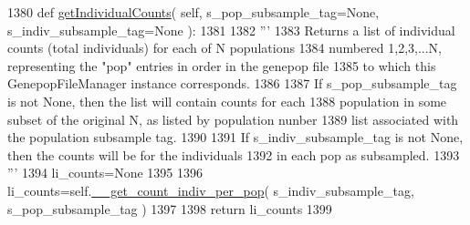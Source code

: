 \begin{DoxyCode}
1380     \textcolor{keyword}{def }\hyperlink{classnegui_1_1genepopfilemanager_1_1GenepopFileManager_aca743749002b9828cd66730e42db4387}{getIndividualCounts}( self, s\_pop\_subsample\_tag=None, s\_indiv\_subsample\_tag=None 
      ):
1381 
1382         \textcolor{stringliteral}{'''}
1383 \textcolor{stringliteral}{        Returns a list of individual counts (total individuals) for each of N populations}
1384 \textcolor{stringliteral}{        numbered 1,2,3,...N, representing the "pop" entries in order in the genepop file}
1385 \textcolor{stringliteral}{        to which this GenepopFileManager instance corresponds.}
1386 \textcolor{stringliteral}{}
1387 \textcolor{stringliteral}{        If s\_pop\_subsample\_tag is not None, then the list will contain counts for each}
1388 \textcolor{stringliteral}{        population in some subset of the original N, as listed by population nunber }
1389 \textcolor{stringliteral}{        list associated with the population subsample tag.}
1390 \textcolor{stringliteral}{}
1391 \textcolor{stringliteral}{        If s\_indiv\_subsample\_tag is not None, then the counts will be for the individuals}
1392 \textcolor{stringliteral}{        in each pop as subsampled.}
1393 \textcolor{stringliteral}{        '''}
1394         li\_counts=\textcolor{keywordtype}{None}
1395 
1396         li\_counts=self.\hyperlink{classnegui_1_1genepopfilemanager_1_1GenepopFileManager_a8efe11151549d7da2bc024f836491af4}{\_\_get\_count\_indiv\_per\_pop}( s\_indiv\_subsample\_tag, 
      s\_pop\_subsample\_tag ) 
1397 
1398         \textcolor{keywordflow}{return} li\_counts
1399 
\end{DoxyCode}
